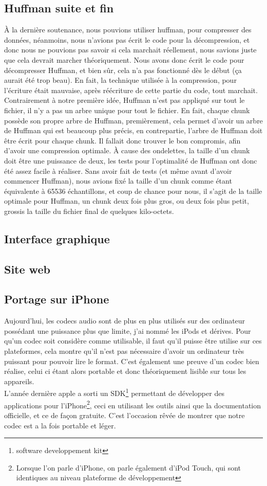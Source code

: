 \documentclass[a4paper,12pt]{article}
\begin{document}
	\subsection{Huffman suite et fin}
À la dernière soutenance, nous pouvions utiliser huffman, pour compresser des
données, néanmoins, nous n'avions pas écrit le code pour la décompression, et
donc nous ne pouvions pas savoir si cela marchait réellement, nous savions juste
que cela devrait marcher théoriquement. Nous avons donc écrit le code pour
décompresser Huffman, et bien sûr, cela n'a pas fonctionné dès le début (ça
aurait été trop beau). En fait, la technique utilisée à la compression, pour
l'écriture était mauvaise, après réécriture de cette partie du code, tout
marchait.\\
Contrairement à notre première idée, Huffman n'est pas appliqué sur tout le
fichier, il n'y a pas un arbre unique pour tout le fichier. En fait, chaque
chunk possède son propre arbre de Huffman, premièrement, cela permet d'avoir un
arbre de Huffman qui est beaucoup plus précis, en contrepartie, l'arbre de
Huffman doit être écrit pour chaque chunk. Il fallait donc trouver le bon
compromis, afin d'avoir une compression optimale. À cause des ondelettes, la
taille d'un chunk doit être une puissance de deux, les tests pour l'optimalité
de Huffman ont donc été assez facile à réaliser. Sans avoir fait de tests (et
même avant d'avoir commencer Huffman), nous avions fixé la taille d'un chunk
comme étant équivalente à 65536 échantillons, et coup de chance pour nous, il
s'agit de la taille optimale pour Huffman, un chunk deux fois plus gros, ou deux
fois plus petit, grossis la taille du fichier final de quelques
kilo-octets.\\
	\subsection{Interface graphique}
	\subsection{Site web}
	\subsection{Portage sur iPhone}
Aujourd'hui, les codecs audio sont de plus en plus utilisés sur des
ordinateur possédant une puissance plus que limite, j'ai nommé les iPods
et dérives. Pour qu'un codec soit considère comme utilisable, il faut
qu'il puisse être utilise sur ces plateformes, cela montre qu'il n'est
pas nécessaire d'avoir un ordinateur très puissant pour pouvoir lire le
format. C'est également une preuve d'un codec bien réalise, celui ci
étant alors portable et donc théoriquement lisible sur tous les
appareils.\\
L'année dernière apple a sorti un SDK\footnote{software developpement
kit} permettant de développer des applications pour l'iPhone\footnote{Lorsque
l'on parle d'iPhone, on parle également d'iPod Touch, qui sont identiques au
niveau plateforme de développement}, ceci en
utilisant les outils ainsi que la documentation officielle, et ce de façon gratuite.
C'est l'occasion rêvée de montrer que notre codec est a la fois
portable et léger.\\
\end{document}
